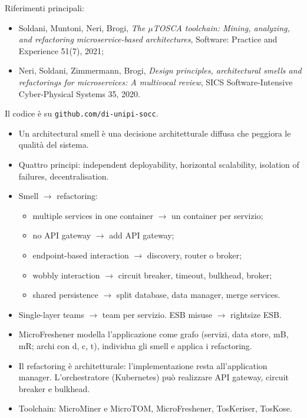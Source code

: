 Riferimenti principali:
\begin{itemize}
  \item Soldani, Muntoni, Neri, Brogi, \emph{The $\mu$TOSCA toolchain: Mining, analyzing, and refactoring
    microservice-based architectures}, Software: Practice and Experience 51(7), 2021;
  \item Neri, Soldani, Zimmermann, Brogi, \emph{Design principles, architectural smells and refactorings for
    microservices: A multivocal review}, SICS Software-Intensive Cyber-Physical Systems 35, 2020.
\end{itemize}
Il codice è su \texttt{github.com/di-unipi-socc}.

\begin{puntichiave}
\begin{itemize}
  \item Un architectural smell è una decisione architetturale diffusa che peggiora le qualità del sistema.
  \item Quattro principi: independent deployability, horizontal scalability, isolation of failures, decentralisation.
  \item Smell $\to$ refactoring:
    \begin{itemize}
      \item multiple services in one container $\to$ un container per servizio;
      \item no API gateway $\to$ add API gateway;
      \item endpoint-based interaction $\to$ discovery, router o broker;
      \item wobbly interaction $\to$ circuit breaker, timeout, bulkhead, broker;
      \item shared persistence $\to$ split database, data manager, merge services.
    \end{itemize}
  \item Single-layer teams $\to$ team per servizio. ESB misuse $\to$ rightsize ESB.
  \item MicroFreshener modella l'applicazione come grafo (servizi, data store, mB, mR; archi con d, c, t), individua gli
    smell e applica i refactoring.
  \item Il refactoring è architetturale: l'implementazione resta all'application manager. L'orchestratore (Kubernetes) può
    realizzare API gateway, circuit breaker e bulkhead.
  \item Toolchain: MicroMiner e MicroTOM, MicroFreshener, TosKeriser, TosKose.
\end{itemize}
\end{puntichiave}

